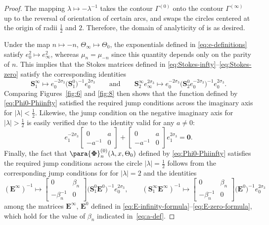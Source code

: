 \begin{proof}
The mapping $\lambda\mapsto -\lambda^{-1}$ takes the contour $\Gamma^{(0)}$ onto the contour $\Gamma^{(\infty)}$ up to the reversal of orientation of certain arcs, and swaps the circles centered at the origin of radii $\frac{1}{2}$ and $2$. Therefore, the domain of analyticity of  is as desired.

Under the map $n \mapsto -n$, $\Theta_\infty \mapsto \Theta_0$, the exponentials defined in \eqref{eq:e-definitions} satisfy $e_{0}^2 \mapsto e_{\infty}^2$, whereas $\mu_n = \mu_{-n}$ since this quantity depends only on the parity of $n$. This implies that the Stokes matrices defined in \eqref{eq:Stokes-infty}--\eqref{eq:Stokes-zero} satisfy the corresponding identities
\begin{equation*}
 \mathbf{S}^\infty_1 \mapsto e_0^{-2\sigma_3}\big(\mathbf{S}^0_{1}\big)^{-1}e_0^{2\sigma_3} \qquad\text{and}\qquad
 \mathbf{S}^\infty_{{2}}e_\infty^{2\sigma_3} \mapsto e_0^{-2\sigma_3}\big(\mathbf{S}^0_{2} e_0^{-2\sigma_3}\big)^{-1} e_0^{2\sigma_3}.
\end{equation*}
Comparing Figures~\ref{fig:6} and \ref{fig:8} then shows that the function defined by \eqref{eq:Phi0-Phiinfty} satisfied the required jump conditions across the imaginary axis for $|\lambda|<\frac{1}{2}$. Likewise, the jump condition on the negative imaginary axis for $|\lambda|>\frac{1}{2}$ is easily verified due to the identity valid for any $a\neq 0$:
\begin{equation*}
 e_1^{-2 \sigma_3}\begin{bmatrix}0&a\\-a^{-1} & 0\end{bmatrix} +\begin{bmatrix}0 & a\\-a^{-1} & 0\end{bmatrix}e_1^{2 \sigma_3}=\mathbf{0}.
\end{equation*}
Finally, the fact that $\para{\mathbf{\Phi}}^{(0)}_n(\lambda,x, \Theta_0)$ defined by \eqref{eq:Phi0-Phiinfty} satisfies the required jump conditions across the circle $|\lambda|=\frac{1}{2}$ follows from the corresponding jump conditions for  for $|\lambda|=2$ and the identities
\begin{equation*}
 (\mathbf{E}^{\infty})^{-1} \mapsto \begin{bmatrix}0 & \beta_n\\-\beta_n^{-1} & 0\end{bmatrix} \big(\mathbf{S}_1^0 \mathbf{E}^0\big)^{-1} e_0^{2\sigma_3}, \qquad(\mathbf{S}_1^\infty \mathbf{E}^{\infty})^{-1} \mapsto \begin{bmatrix}0 & \beta_n\\-\beta_n^{-1} & 0\end{bmatrix} \big( \mathbf{E}^0\big)^{-1} e_0^{2\sigma_3}
\end{equation*}
among the matrices $\mathbf{E}^\infty$, $\mathbf{E}^0$ defined in \eqref{eq:E-infinity-formula}--\eqref{eq:E-zero-formula}, which hold for the value of $\beta_n$ indicated in~\eqref{eq:a-def}.


\end{proof}
